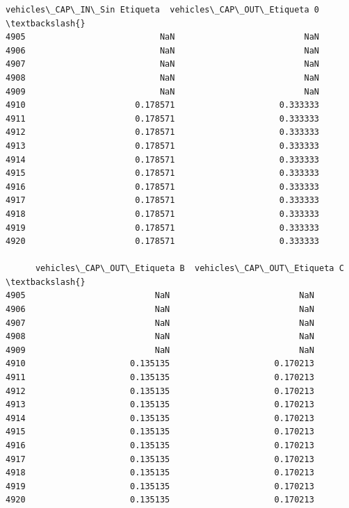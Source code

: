\documentclass[11pt]{article}
\begin{document}
\begin{tcolorbox}[breakable, size=fbox, boxrule=.5pt, pad at break*=1mm, opacityfill=0]
\begin{Verbatim}[commandchars=\\\{\}]
      vehicles\_CAP\_IN\_Sin Etiqueta  vehicles\_CAP\_OUT\_Etiqueta 0  \textbackslash{}
4905                           NaN                          NaN
4906                           NaN                          NaN
4907                           NaN                          NaN
4908                           NaN                          NaN
4909                           NaN                          NaN
4910                      0.178571                     0.333333
4911                      0.178571                     0.333333
4912                      0.178571                     0.333333
4913                      0.178571                     0.333333
4914                      0.178571                     0.333333
4915                      0.178571                     0.333333
4916                      0.178571                     0.333333
4917                      0.178571                     0.333333
4918                      0.178571                     0.333333
4919                      0.178571                     0.333333
4920                      0.178571                     0.333333

      vehicles\_CAP\_OUT\_Etiqueta B  vehicles\_CAP\_OUT\_Etiqueta C  \textbackslash{}
4905                          NaN                          NaN
4906                          NaN                          NaN
4907                          NaN                          NaN
4908                          NaN                          NaN
4909                          NaN                          NaN
4910                     0.135135                     0.170213
4911                     0.135135                     0.170213
4912                     0.135135                     0.170213
4913                     0.135135                     0.170213
4914                     0.135135                     0.170213
4915                     0.135135                     0.170213
4916                     0.135135                     0.170213
4917                     0.135135                     0.170213
4918                     0.135135                     0.170213
4919                     0.135135                     0.170213
4920                     0.135135                     0.170213


\end{Verbatim}
\end{tcolorbox}
\end{document}
